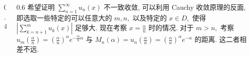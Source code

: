 \begin{frame}
\begin{columns}
\begin{column}{0.4\textwidth}
\begin{center}
{\begin{tikzpicture}[scale=0.8, every node/.append style={scale=0.8}]
\end{tikzpicture}
}
\end{center}
\end{column}
\begin{column}{0.6\textwidth}
希望证明 $\sum_{n=1}^\infty u_n(x)$ 不一致收敛, 可以利用 Cauchy 收敛原理的反面, 即选取一些特定的可以任意大的 $m, n,$ 以及特定的 $x \in D,$ 使得 $\left| \sum_{k=n+1}^m u_k(x) \right|$ 足够大.
\pause
现在考察 $x = \frac{\alpha}{n}$ 时的情况. 对于 $m > n,$ 考察 $u_m\left(\frac{\alpha}{n}\right) = \left( \frac{\alpha}{n} \right)^\alpha e^{-\frac{m}{n} \alpha}$ 与 $M_n(\alpha) = u_n\left(\frac{\alpha}{n}\right) = \left( \frac{\alpha}{n} \right)^\alpha e^{-\alpha}$ 的距离. 这二者相差不远.
\end{column}
\end{columns}

\end{frame}


